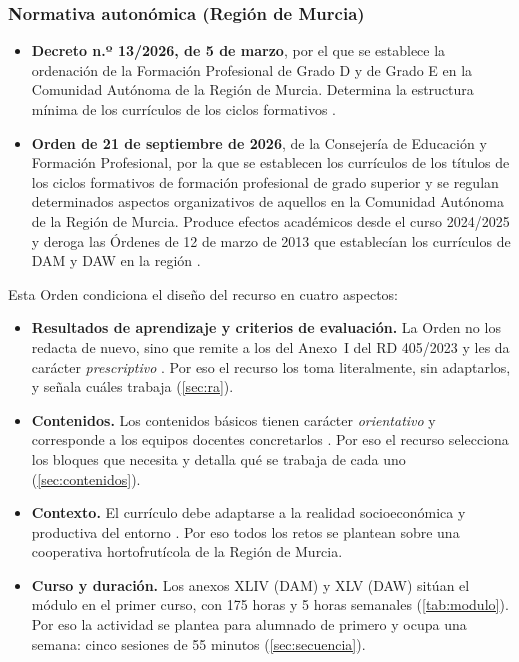 \documentclass[11pt,a4paper]{article}
\begin{document}
\subsubsection{Normativa autonómica (Región de Murcia)}

\begin{itemize}
  \item \textbf{Decreto n.º 13/2026, de 5 de marzo}, por el que se establece la ordenación
        de la Formación Profesional de Grado D y de Grado E en la Comunidad Autónoma de la
        Región de Murcia. Determina la estructura mínima de los currículos de los ciclos
        formativos \cite{decreto13}.
  \item \textbf{Orden de 21 de septiembre de 2026}, de la Consejería de Educación y Formación
        Profesional, por la que se establecen los currículos de los títulos de los ciclos
        formativos de formación profesional de grado superior y se regulan determinados
        aspectos organizativos de aquellos en la Comunidad Autónoma de la Región de Murcia.
        Produce efectos académicos desde el
        curso 2024/2025 y deroga las Órdenes de 12 de marzo de 2013 que establecían los
        currículos de DAM y DAW en la región \cite{murcia2026}.
\end{itemize}

Esta Orden condiciona el diseño del recurso en cuatro aspectos:
\begin{itemize}
  \item \textbf{Resultados de aprendizaje y criterios de evaluación.} La Orden no los
        redacta de nuevo, sino que remite a los del Anexo~I del RD 405/2023 y les da carácter
        \emph{prescriptivo} \cite[art.~3]{murcia2026}. Por eso el recurso los toma
        literalmente, sin adaptarlos, y señala cuáles trabaja (\autoref{sec:ra}).
  \item \textbf{Contenidos.} Los contenidos básicos tienen carácter \emph{orientativo} y
        corresponde a los equipos docentes concretarlos \cite[art.~3]{murcia2026}. Por eso el
        recurso selecciona los bloques que necesita y detalla qué se trabaja de cada uno
        (\autoref{sec:contenidos}).
  \item \textbf{Contexto.} El currículo debe adaptarse a la realidad socioeconómica y
        productiva del entorno \cite[art.~4]{murcia2026}. Por eso todos los retos se plantean
        sobre una cooperativa hortofrutícola de la Región de Murcia.
  \item \textbf{Curso y duración.} Los anexos XLIV (DAM) y XLV (DAW) sitúan el módulo en el
        primer curso, con 175 horas y 5 horas semanales (\autoref{tab:modulo}). Por eso la
        actividad se plantea para alumnado de primero y ocupa una semana: cinco sesiones de
        55 minutos (\autoref{sec:secuencia}).
\end{itemize}
\end{document}

